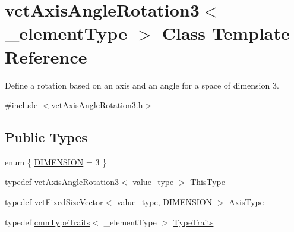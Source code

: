 \hypertarget{classvct_axis_angle_rotation3}{}\section{vct\+Axis\+Angle\+Rotation3$<$ \+\_\+element\+Type $>$ Class Template Reference}
\label{classvct_axis_angle_rotation3}


Define a rotation based on an axis and an angle for a space of dimension 3.  




{\ttfamily \#include $<$vct\+Axis\+Angle\+Rotation3.\+h$>$}

\subsection*{Public Types}
\begin{DoxyCompactItemize}
\item 
enum \{ \hyperlink{group__cisst_vector_gga278b4a98a62e4f5ff42ce055836240a9a778d22dfe29402d2cfdd381c1b870285}{D\+I\+M\+E\+N\+S\+I\+O\+N} = 3
 \}
\item 
typedef \hyperlink{classvct_axis_angle_rotation3}{vct\+Axis\+Angle\+Rotation3}$<$ value\+\_\+type $>$ \hyperlink{classvct_axis_angle_rotation3_af654a8037b7b82a378f69cb1bfd9b8dd}{This\+Type}
\item 
typedef \hyperlink{classvct_fixed_size_vector}{vct\+Fixed\+Size\+Vector}$<$ value\+\_\+type, \hyperlink{group__cisst_vector_gga278b4a98a62e4f5ff42ce055836240a9a778d22dfe29402d2cfdd381c1b870285}{D\+I\+M\+E\+N\+S\+I\+O\+N} $>$ \hyperlink{classvct_axis_angle_rotation3_a3178fd901bb60bb447711b9d5f7e7aae}{Axis\+Type}
\item 
typedef \hyperlink{classcmn_type_traits}{cmn\+Type\+Traits}$<$ \+\_\+element\+Type $>$ \hyperlink{classvct_axis_angle_rotation3_a7765132e2cf950c6598eb4d75e6fc297}{Type\+Traits}
\end{DoxyCompactItemize}
